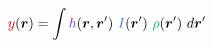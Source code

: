 \documentclass[preview]{standalone}
\begin{document}
$$ \color{red} y \color{black} (\boldsymbol{r}) = \int \color{violet}h \color{black} (\boldsymbol{r},\boldsymbol{r}')\ \color{blue}I\color{black}(\boldsymbol{r}')\ \color{green}\rho\color{black}(\boldsymbol{r}')\ d\boldsymbol{r}'$$
\end{document}
